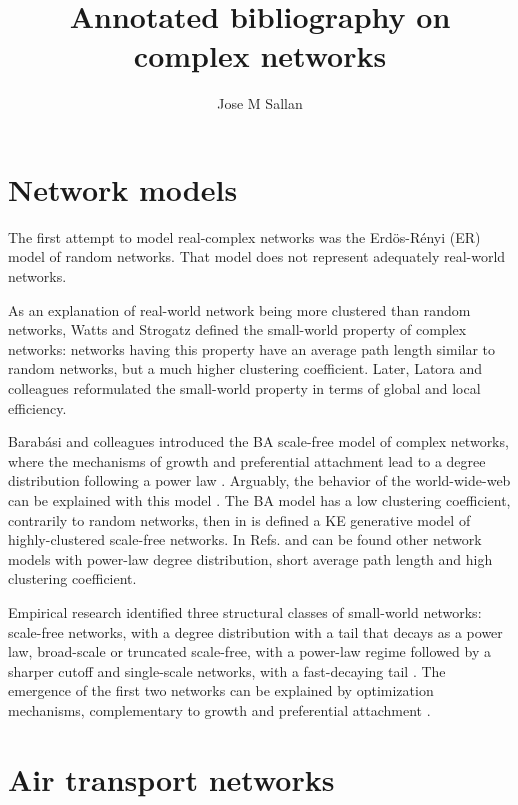 \documentclass[12pt]{article}
\title{Annotated bibliography on complex networks}
\author{Jose M Sallan}
\date{}
\begin{document}
\maketitle

\section{Network models}

The first attempt to model real-complex networks was the Erdös-R\'enyi (ER) model of random networks. That model does not represent adequately real-world networks. \medskip

As an explanation of real-world network being more clustered than random networks, Watts and Strogatz \cite{Watts1998a} defined the small-world property of complex networks: networks having this property have an average path length similar to random networks, but a much higher clustering coefficient. Later, Latora and colleagues \cite{Latora2001} reformulated the small-world property in terms of global and local efficiency. \medskip

Barab\'asi and colleagues introduced the BA scale-free model of complex networks, where the mechanisms of growth and preferential attachment lead to a degree distribution following a power law \cite{BarabasiA.-L;Albert1999}. Arguably, the behavior of the world-wide-web can be explained with this model \cite{Barabasi2000}. The BA model has a low clustering coefficient, contrarily to random networks, then in \cite{Klemm2002} is defined a KE generative model of highly-clustered scale-free networks. In Refs. \cite{Holme2002d} and \cite{Ravasz2003} can be found other network models with power-law degree distribution, short average path length and high clustering coefficient.\medskip

Empirical research identified three structural classes of small-world networks: scale-free networks, with a degree distribution with a tail that decays as a power law, broad-scale or truncated scale-free, with a power-law regime followed by a  sharper cutoff and single-scale networks, with a  fast-decaying tail \cite{Amaral2000}. The emergence of the first two networks can be explained by optimization mechanisms, complementary to growth and preferential attachment \cite{Cancho2003}.

\section{Air transport networks}
\end{document}
